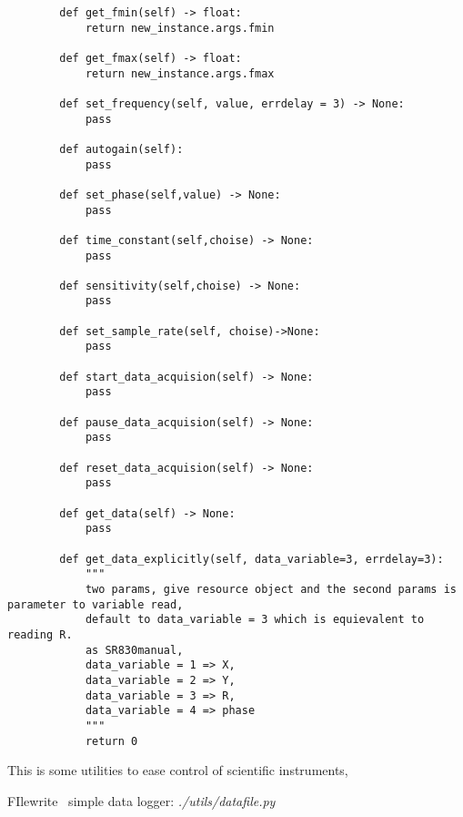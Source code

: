 \begin{verbatim}
        def get_fmin(self) -> float:
            return new_instance.args.fmin
    
        def get_fmax(self) -> float:
            return new_instance.args.fmax
        
        def set_frequency(self, value, errdelay = 3) -> None:
            pass

        def autogain(self):
            pass

        def set_phase(self,value) -> None:
            pass

        def time_constant(self,choise) -> None:
            pass

        def sensitivity(self,choise) -> None:
            pass

        def set_sample_rate(self, choise)->None:
            pass

        def start_data_acquision(self) -> None:
            pass

        def pause_data_acquision(self) -> None:
            pass

        def reset_data_acquision(self) -> None:
            pass

        def get_data(self) -> None:
            pass

        def get_data_explicitly(self, data_variable=3, errdelay=3):
            """
            two params, give resource object and the second params is parameter to variable read,
            default to data_variable = 3 which is equievalent to reading R.
            as SR830manual, 
            data_variable = 1 => X,
            data_variable = 2 => Y,
            data_variable = 3 => R,
            data_variable = 4 => phase
            """
            return 0
\end{verbatim}

This is some utilities to ease control of scientific instruments,

FIlewrite \ simple data logger: \emph{./utils/datafile.py}


